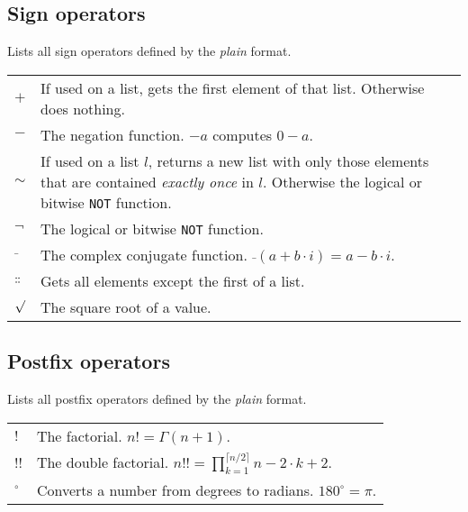 \documentclass[10pt]{article}
\begin{document}
    \subsection{Sign operators}
    Lists all sign operators defined by the \textit{plain} format.
    \begin{longtable}{p{}p{}}
        $ + $                   & If used on a list, gets the first element of that list.
                                  Otherwise does nothing. \\
        $ - $                   & The negation function. $ -a $ computes $ 0 - a $. \\
        $ \sim $                & If used on a list $ l $, returns a new list with only those elements that are contained \textsl{exactly once} in $ l $.
                                  Otherwise the logical or bitwise \texttt{NOT} function. \\
        $ \neg $                & The logical or bitwise \texttt{NOT} function. \\
        $ \bar{\;} $            & The complex conjugate function. $ \bar{\;}(a + b \cdot i) = a - b \cdot i $. \\
        $ \dblcolon $           & Gets all elements except the first of a list. \\
        $ \sqrt{\vphantom{0}} $ & The square root of a value.
    \end{longtable}
    
    \subsection{Postfix operators}
    Lists all postfix operators defined by the \textit{plain} format.
    \begin{longtable}{p{}p{}}
        $ ! $      & The factorial. $ n! = \Gamma(n + 1) $. \\
        $ !! $     & The double factorial. $ n!! = \prod\limits_{k=1}^{\lceil n/2 \rceil} n -2 \cdot k + 2 $. \\
        $ ^\circ $ & Converts a number from degrees to radians. $ 180^\circ = \pi $.
    \end{longtable}
    
\end{document}
